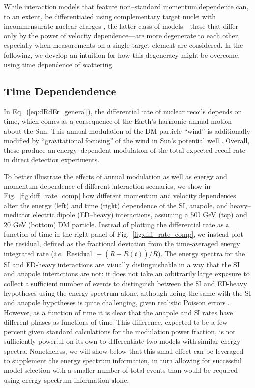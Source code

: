 \documentclass[11pt]{article}
\newcommand{\ie}{{\it i.e.~}}  \newcommand{\eg}{{\it e.g.~}}
\newcommand{\Eq}[1]{Eq.~(\ref{#1})} \newcommand{\Eqs}[2]{Eqs.~(\ref{#1}) and (\ref{#2})} \newcommand{\Eqm}[2]{Eqs.~(\ref{#1}) through (\ref{#2})}
\newcommand{\Fig}[1]{Fig.~\ref{#1}} \newcommand{\Figs}[2]{Figs.~\ref{#1} and \ref{#2}}
\begin{document}
While interaction models that feature non--standard momentum dependence can, to an extent, be differentiated using complementary target nuclei with incommensurate nuclear charges \cite{Gluscevic:2015sqa}, the latter class of models---those that differ only by the power of velocity dependence---are more degenerate to each other, especially when measurements on a single target element are considered. In the following, we develop an intuition for how this degeneracy might be overcome, using time dependence of scattering.

\subsection{Time Dependendence}
\label{subsec:time}

In \Eq{eq:dRdEr_general}, the differential rate of nuclear recoils depends on time, which comes as a consequence of the Earth's harmonic annual motion about the Sun. This annual modulation of the DM particle ``wind'' is additionally modified by ``gravitational focusing'' of the wind in Sun's potential well \cite{Danby01021957,Griest:1987vc,Sikivie:2002bj,Alenazi:2006wu}. Overall, these produce an energy--dependent modulation of the total expected recoil rate in direct detection experiments. 

To better illustrate the effects of annual modulation as well as energy and momentum dependence of different interaction scenarios, we show in \Fig{fig:diff_rate_comp} how different momentum and velocity dependences alter the energy (left) and time (right) dependence of the SI, anapole, and heavy--mediator electric dipole (ED--heavy) interactions, assuming a $500$ GeV (top) and $20$ GeV (bottom) DM particle. Instead of plotting the differential rate as a function of time in the right panel of \Fig{fig:diff_rate_comp}, we instead plot the residual, defined as the fractional deviation from the time-averaged energy integrated rate (\ie Residual $\equiv (\bar{R} - R(t))/\bar{R}$). The energy spectra for the SI and ED-heavy interactions are visually distinguishable in a way that the SI and anapole interactions are not: it does not take an arbitrarily large exposure to collect a sufficient number of events to distinguish between the SI and ED-heavy hypotheses using the energy spectrum alone, although doing the same with the SI and anapole hypotheses is quite challenging, given realistic Poisson errors \cite{Gluscevic:2015sqa}. However, as a function of time it is clear that the anapole and SI rates have different phases as functions of time. This difference, expected to be a few percent given standard calculations for the modulation power fraction, is not sufficiently powerful on its own to differentiate two models with similar energy spectra. Nonetheless, we will show below that this small effect can be leveraged to supplement the energy spectrum information, in turn allowing for successful model selection with a smaller number of total events than would be required using energy spectrum information alone.
\end{document}
